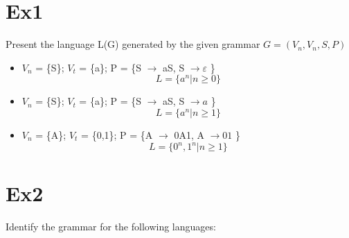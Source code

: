 \documentclass[12pt]{article}
\begin{document}



\newpage


\section*{Ex1}
Present the language L(G) generated by the given grammar
$G=(V_n ,V_n , S , P)$
\begin{itemize}

    \item  $V_n$ = \{S\}; $V_t$ = \{a\}; P = \{S  $\to$  aS, S $\to \varepsilon  $ \}
          \begin{equation}
              L= \{ a^n | n \geq  0 \}
          \end{equation}

    \item $V_n$ = \{S\}; $V_t$ = \{a\}; P = \{S  $\to$  aS, S $\to a $ \}
          \begin{equation}
              L= \{ a^n | n \geq  1 \}
          \end{equation}

    \item $V_n$ = \{A\}; $V_t$ = \{0,1\}; P = \{A  $\to$  0A1, A $\to 01 $ \}
          \begin{equation}
              L= \{ 0^n, 1^n | n \geq  1 \}
          \end{equation}

\end{itemize}



\newpage



\section*{Ex2}
Identify the grammar for the following languages:
\end{document}
